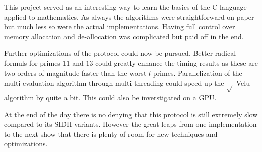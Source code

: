 \documentclass[../main.tex]{subfiles}
\begin{document}
This project served as an interesting way to learn the basics of the C language applied to mathematics.
As always the algorithms were straightforward on paper but much less so were the actual implementations.
Having full control over memory allocation and de-allocation was complicated but paid off in the end.

Further optimizations of the protocol could now be pursued.
Better radical formuls for primes $11$ and $13$ could greatly enhance the timing results as these are two orders of magnitude faster than the worst $l$-primes.
Parallelization of the multi-evaluation algorithm through multi-threading could speed up the $\sqrt{}$-Velu algorithm by quite a bit.
This could also be inverstigated on a GPU.

At the end of the day there is no denying that this protocol is still extremely slow compared to its SIDH variants.
However the great leaps from one implementation to the next show that there is plenty of room for new techniques and optimizations.
\end{document}
